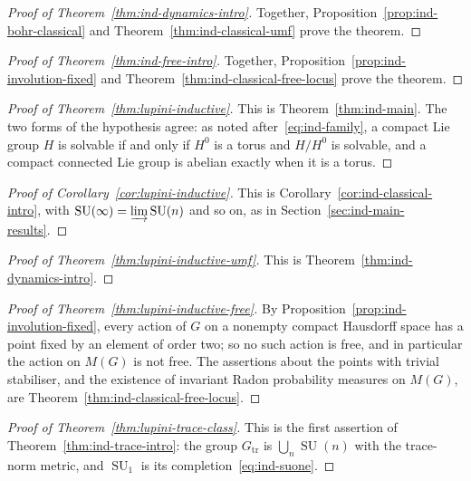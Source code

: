 \begin{proof}[Proof of Theorem~\ref{thm:ind-dynamics-intro}]
Together, Proposition~\ref{prop:ind-bohr-classical} and
Theorem~\ref{thm:ind-classical-umf} prove the theorem.
\end{proof}

\begin{proof}[Proof of Theorem~\ref{thm:ind-free-intro}]
Together, Proposition~\ref{prop:ind-involution-fixed} and
Theorem~\ref{thm:ind-classical-free-locus} prove the theorem.
\end{proof}

\begin{proof}[Proof of Theorem~\ref{thm:lupini-inductive}]
This is Theorem~\ref{thm:ind-main}. The two forms of the hypothesis agree: as
noted after~\eqref{eq:ind-family}, a compact Lie group $H$ is solvable if and
only if $H^0$ is a torus and $H/H^0$ is solvable, and a compact connected Lie
group is abelian exactly when it is a torus.
\end{proof}

\begin{proof}[Proof of Corollary~\ref{cor:lupini-inductive}]
This is Corollary~\ref{cor:ind-classical-intro}, with
$\operatorname{SU}(\infty)=\varinjlim\operatorname{SU}(n)$ and so on, as in
Section~\ref{sec:ind-main-results}.
\end{proof}

\begin{proof}[Proof of Theorem~\ref{thm:lupini-inductive-umf}]
This is Theorem~\ref{thm:ind-dynamics-intro}.
\end{proof}

\begin{proof}[Proof of Theorem~\ref{thm:lupini-inductive-free}]
By Proposition~\ref{prop:ind-involution-fixed}, every action of $G$ on a nonempty
compact Hausdorff space has a point fixed by an element of order two; so no
such action is free, and in particular the action on $M(G)$ is not free. The
assertions about the points with trivial stabiliser, and the existence of
invariant Radon probability measures on $M(G)$, are
Theorem~\ref{thm:ind-classical-free-locus}.
\end{proof}

\begin{proof}[Proof of Theorem~\ref{thm:lupini-trace-class}]
This is the first assertion of Theorem~\ref{thm:ind-trace-intro}: the group
$G_{\mathrm{tr}}$ is $\bigcup_n\operatorname{SU}(n)$ with the trace-norm metric,
and $\operatorname{SU}_1$ is its completion~\eqref{eq:ind-suone}.
\end{proof}
